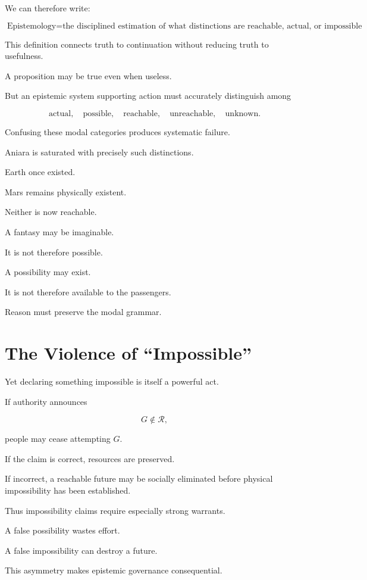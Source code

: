 \documentclass[11pt,oneside]{book}
\theoremstyle{definition}
\theoremstyle{remark}
\newcommand{\R}{\mathcal{R}}
\begin{document}
We can therefore write:

\[
\boxed{
\text{Epistemology}
=
\text{the disciplined estimation of what distinctions are reachable, actual, or impossible under specified conditions.}
}
\]

This definition connects truth to continuation without reducing truth to usefulness.

A proposition may be true even when useless.

But an epistemic system supporting action must accurately distinguish among

\[
\text{actual},
\quad
\text{possible},
\quad
\text{reachable},
\quad
\text{unreachable},
\quad
\text{unknown}.
\]

Confusing these modal categories produces systematic failure.

Aniara is saturated with precisely such distinctions.

Earth once existed.

Mars remains physically existent.

Neither is now reachable.

A fantasy may be imaginable.

It is not therefore possible.

A possibility may exist.

It is not therefore available to the passengers.

Reason must preserve the modal grammar.

\section{The Violence of ``Impossible''}

Yet declaring something impossible is itself a powerful act.

If authority announces

\[
G\notin\R,
\]

people may cease attempting \(G\).

If the claim is correct, resources are preserved.

If incorrect, a reachable future may be socially eliminated before physical impossibility has been established.

Thus impossibility claims require especially strong warrants.

A false possibility wastes effort.

A false impossibility can destroy a future.

This asymmetry makes epistemic governance consequential.
\end{document}
